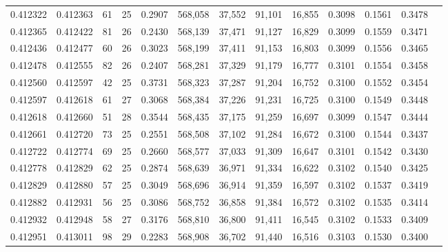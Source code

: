 \begin{tabular}{rrrrrrrrrrrrr}
0.412322 & 0.412363 &    61 &  25 &                                     0.2907 & 568,058 &  37,552 &  91,101 &  16,855 & 0.3098 & 0.1561 & 0.3478 \\
0.412365 & 0.412422 &    81 &  26 &                                     0.2430 & 568,139 &  37,471 &  91,127 &  16,829 & 0.3099 & 0.1559 & 0.3471 \\
0.412436 & 0.412477 &    60 &  26 &                                     0.3023 & 568,199 &  37,411 &  91,153 &  16,803 & 0.3099 & 0.1556 & 0.3465 \\
0.412478 & 0.412555 &    82 &  26 &                                     0.2407 & 568,281 &  37,329 &  91,179 &  16,777 & 0.3101 & 0.1554 & 0.3458 \\
0.412560 & 0.412597 &    42 &  25 &                                     0.3731 & 568,323 &  37,287 &  91,204 &  16,752 & 0.3100 & 0.1552 & 0.3454 \\
0.412597 & 0.412618 &    61 &  27 &                                     0.3068 & 568,384 &  37,226 &  91,231 &  16,725 & 0.3100 & 0.1549 & 0.3448 \\
0.412618 & 0.412660 &    51 &  28 &                                     0.3544 & 568,435 &  37,175 &  91,259 &  16,697 & 0.3099 & 0.1547 & 0.3444 \\
0.412661 & 0.412720 &    73 &  25 &                                     0.2551 & 568,508 &  37,102 &  91,284 &  16,672 & 0.3100 & 0.1544 & 0.3437 \\
0.412722 & 0.412774 &    69 &  25 &                                     0.2660 & 568,577 &  37,033 &  91,309 &  16,647 & 0.3101 & 0.1542 & 0.3430 \\
0.412778 & 0.412829 &    62 &  25 &                                     0.2874 & 568,639 &  36,971 &  91,334 &  16,622 & 0.3102 & 0.1540 & 0.3425 \\
0.412829 & 0.412880 &    57 &  25 &                                     0.3049 & 568,696 &  36,914 &  91,359 &  16,597 & 0.3102 & 0.1537 & 0.3419 \\
0.412882 & 0.412931 &    56 &  25 &                                     0.3086 & 568,752 &  36,858 &  91,384 &  16,572 & 0.3102 & 0.1535 & 0.3414 \\
0.412932 & 0.412948 &    58 &  27 &                                     0.3176 & 568,810 &  36,800 &  91,411 &  16,545 & 0.3102 & 0.1533 & 0.3409 \\
0.412951 & 0.413011 &    98 &  29 &                                     0.2283 & 568,908 &  36,702 &  91,440 &  16,516 & 0.3103 & 0.1530 & 0.3400 \\

\end{tabular}
